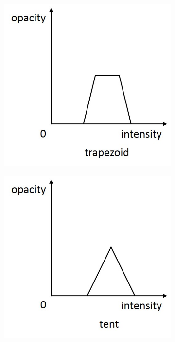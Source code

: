 \documentclass{egpubl}
\begin{document}
\begin{figure}
	\centering
	
	\begin{subfigure}{.2\textwidth}
		\includegraphics[width=1\textwidth]{konig_mastering_2000-zhou_automatic_2009_a.jpg}
	\end{subfigure}
	\begin{subfigure}{.2\textwidth}
		\includegraphics[width=1\textwidth]{konig_mastering_2000-zhou_automatic_2009_b.jpg}

\end{subfigure}
\end{figure}
\end{document}
